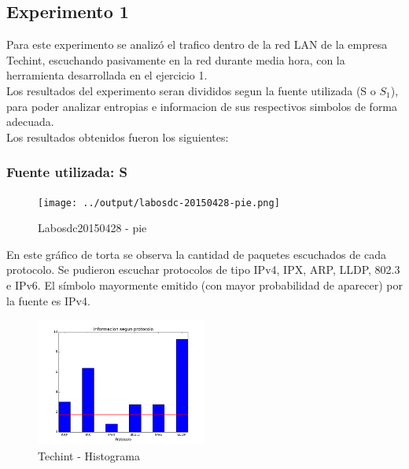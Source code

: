 \documentclass[final,narroweqnarray,inline]{ieee}
\begin{document}
\subsection{Experimento 1}
Para este experimento se analiz\'o el trafico dentro de la red LAN de la empresa Techint, escuchando pasivamente
en la red durante media hora, con la herramienta desarrollada en el ejercicio 1. \\
Los resultados del experimento seran divididos segun la fuente utilizada (S o $S_{1}$), para poder analizar
entropias e informacion de sus respectivos simbolos de forma adecuada. \\
Los resultados obtenidos fueron los siguientes: 

\subsubsection{Fuente utilizada: S}


\begin{figure}
\begin{center}
  \texttt{[image: ../output/labosdc-20150428-pie.png]}
  \caption{Labosdc20150428 - pie}
  \label{labosdc20150428-pie}
\end{center}
\end{figure}

En este gráfico de torta se observa la cantidad de paquetes escuchados de cada
protocolo. Se pudieron escuchar protocolos de tipo IPv4, IPX, ARP, LLDP,
802.3 e IPv6. El símbolo mayormente emitido (con mayor probabilidad de
aparecer) por la fuente es IPv4.

\begin{figure}
\begin{center}
  \includegraphics[width=0.5\textwidth]{graficos/techint_histogram.png}
  \caption{Techint - Histograma}
  \label{techint-pie}
\end{center}
\end{figure}
\end{document}
